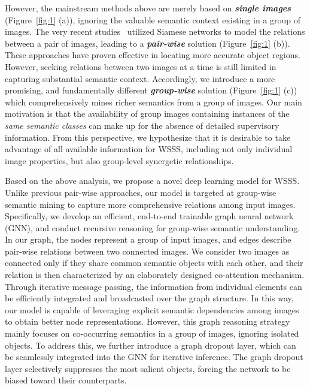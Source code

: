 \documentclass[letterpaper]{article} \usepackage{aaai21}  \usepackage{times}  \usepackage{helvet} \usepackage{courier}  \usepackage[hyphens]{url}  \usepackage{graphicx} \urlstyle{rm} \def\UrlFont{\rm}  \usepackage{graphicx}  \usepackage{natbib}  \usepackage{caption} \frenchspacing  \setlength{\pdfpagewidth}{8.5in}  \setlength{\pdfpageheight}{11in}
\newcommand{\figref}[1]{Figure~\ref{#1}}
\begin{document}
However, the mainstream methods above are merely based on \textit{\textbf{single images}} (\figref{fig:1} (a)), ignoring the valuable semantic context existing in a group of images. The very recent studies~\cite{fan2020cian,sun2020mining} utilized Siamese networks to model the relations between a pair of images, leading to a \textit{\textbf{pair-wise}} solution (\figref{fig:1} (b)). These approaches have proven effective in locating more accurate object regions. However, seeking relations between two images at a time is still limited in capturing substantial semantic context. 
Accordingly, we introduce a more promising, and fundamentally different  \textit{\textbf{group-wise}} solution (\figref{fig:1} (c)) which comprehensively mines richer semantics from a group of images. Our main motivation is that the availability of group images containing instances of the \textit{same semantic classes} can make up for the absence of detailed supervisory information. From this perspective, we hypothesize that it is desirable to take advantage of all available information for WSSS, including not only individual image properties, but also group-level synergetic relationships. 


Based on the above analysis, we propose a novel deep learning model for WSSS. Unlike previous pair-wise approaches, our model is targeted at group-wise semantic mining to capture more comprehensive relations among input images. Specifically, we develop an efficient, end-to-end trainable graph neural network (GNN), and conduct recursive reasoning for group-wise semantic understanding. In our graph, the nodes represent a group of input images, and edges describe pair-wise relations between two connected images.  We consider two images as connected only if they share common semantic objects with each other, and their relation is then characterized by an elaborately designed co-attention mechanism. Through iterative message passing, the information from individual elements can be efficiently integrated and broadcasted over the graph structure. In this way, our model is capable of leveraging explicit semantic dependencies among images to obtain better node representations. However, this graph reasoning strategy mainly focuses on co-occurring semantics in a group of images, ignoring isolated objects. To address this, we further introduce a graph dropout layer, which can be seamlessly integrated into the GNN for iterative inference. The graph dropout layer selectively suppresses the most salient objects, forcing the network to be biased toward their counterparts. 
\end{document}
